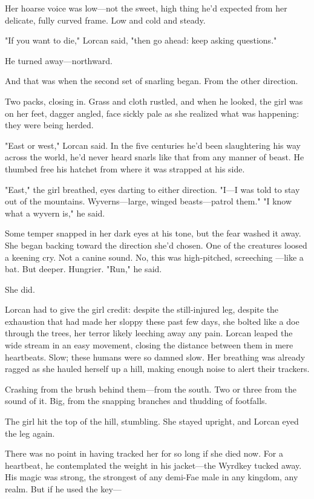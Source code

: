Her hoarse voice was low---not the sweet, high thing he'd expected from her delicate, fully curved frame.
Low and cold and steady.

"If you want to die," Lorcan said, "then go ahead: keep asking questions."

He turned away---northward.

And that was when the second set of snarling began.
From the other direction.

Two packs, closing in.
Grass and cloth rustled, and when he looked, the girl was on her feet, dagger angled, face sickly pale as she realized what was happening: they were being herded.

"East or west," Lorcan said.
In the five centuries he'd been slaughtering his way across the world, he'd never heard snarls like that from any manner of beast.
He thumbed free his hatchet from where it was strapped at his side.

"East," the girl breathed, eyes darting to either direction.
"I---I was told to stay out of the mountains.
Wyverns---large, winged beasts---patrol them."
"I know what a wyvern is," he said.

Some temper snapped in her dark eyes at his tone, but the fear washed it away.
She began backing toward the direction she'd chosen.
One of the creatures loosed a keening cry.
Not a canine sound.
No, this was high-pitched, screeching ---like a bat.
But deeper.
Hungrier.
"Run," he said.

She did.

Lorcan had to give the girl credit: despite the still-injured leg, despite the exhaustion that had made her sloppy these past few days, she bolted like a doe through the trees, her terror likely leeching away any pain.
Lorcan leaped the wide stream in an easy movement, closing the distance between them in mere heartbeats.
Slow; these humans were so damned slow.
Her breathing was already ragged as she hauled herself up a hill, making enough noise to alert their trackers.

Crashing from the brush behind them---from the south.
Two or three from the sound of it.
Big, from the snapping branches and thudding of footfalls.

The girl hit the top of the hill, stumbling.
She stayed upright, and Lorcan eyed the leg again.

There was no point in having tracked her for so long if she died now.
For a heartbeat, he contemplated the weight in his jacket---the Wyrdkey tucked away.
His magic was strong, the strongest of any demi-Fae male in any kingdom, any realm.
But if he used the key---


